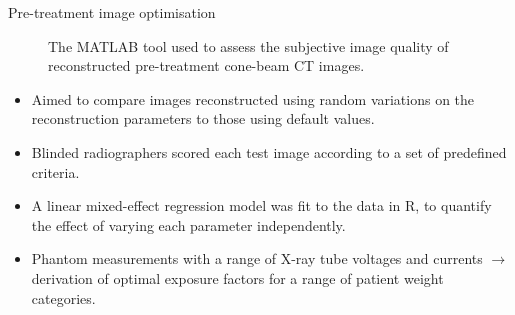 \documentclass[final, unknownkeysallowed]{beamer}
\begin{document}
\begin{frame}{}
\begin{textblock}{19.3}
\begin{block}{Pre-treatment image optimisation}
\begin{figure}
            \caption*{The MATLAB tool used to assess the subjective image quality of reconstructed pre-treatment cone-beam CT images.}\label{fig:cbct_scoring}
        \end{figure}
        \vspace{-5 mm}
        \begin{itemize} \small
        \item Aimed to compare images reconstructed using random variations on the reconstruction parameters to those using default values.
        \item Blinded radiographers scored each test image according to a set of predefined criteria.
        \item A linear mixed-effect regression model was fit to the data in R, to quantify the effect of varying each parameter independently.
        \item Phantom measurements with a range of X-ray tube voltages and currents ${\rightarrow}$ derivation of optimal exposure factors for a range of patient weight categories.
        \end{itemize}
    \end{block}
\end{textblock}
\end{frame}
\end{document}
